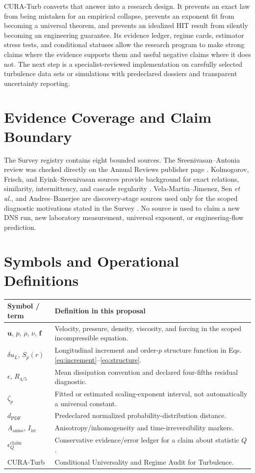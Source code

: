 \documentclass[conference]{../../../../Conference-LaTeX-template_10-17-19/IEEEtran}
\begin{document}
CURA-Turb converts that answer into a research design. It prevents an exact law from being mistaken for an empirical collapse, prevents an exponent fit from becoming a universal theorem, and prevents an idealized HIT result from silently becoming an engineering guarantee. Its evidence ledger, regime cards, estimator stress tests, and conditional statuses allow the research program to make strong claims where the evidence supports them and useful negative claims where it does not. The next step is a specialist-reviewed implementation on carefully selected turbulence data sets or simulations with predeclared dossiers and transparent uncertainty reporting.

\appendices
\section{Evidence Coverage and Claim Boundary}
The Survey registry contains eight bounded sources. The Sreenivasan--Antonia review was checked directly on the Annual Reviews publisher page \cite{sreenivasan_antonia_1997}. Kolmogorov, Frisch, and Eyink--Sreenivasan sources provide background for exact relations, similarity, intermittency, and cascade regularity \cite{kolmogorov_1941,kolmogorov_1962,frisch_1995,eyink_sreenivasan_2006}. Vela-Martin--Jimenez, Sen \emph{et al.}, and Andres--Banerjee are discovery-stage sources used only for the scoped diagnostic motivations stated in the Survey \cite{vela_martin_jimenez_2021,sen_2012,andres_banerjee_2019}. No source is used to claim a new DNS run, new laboratory measurement, universal exponent, or engineering-flow prediction.

\section{Symbols and Operational Definitions}
\begin{tabularx}{0.96\columnwidth}{lY}
\toprule
Symbol / term & Definition in this proposal \\
\midrule
$\mathbf{u}$, $p$, $\rho$, $\nu$, $\mathbf{f}$ & Velocity, pressure, density, viscosity, and forcing in the scoped incompressible equation. \\
$\delta u_L$, $S_p(r)$ & Longitudinal increment and order-$p$ structure function in Eqs. \eqref{eq:increment}--\eqref{eq:structure}. \\
$\epsilon$, $R_{4/5}$ & Mean dissipation convention and declared four-fifths residual diagnostic. \\
$\zeta_p$ & Fitted or estimated scaling-exponent interval, not automatically a universal constant. \\
$d_{\mathrm{PDF}}$ & Predeclared normalized probability-distribution distance. \\
$A_{\mathrm{aniso}}$, $I_{\mathrm{irr}}$ & Anisotropy/inhomogeneity and time-irreversibility markers. \\
$\epsilon_Q^{\mathrm{claim}}$ & Conservative evidence/error ledger for a claim about statistic $Q$. \\
CURA-Turb & Conditional Universality and Regime Audit for Turbulence. \\
\bottomrule
\end{tabularx}
\end{document}

